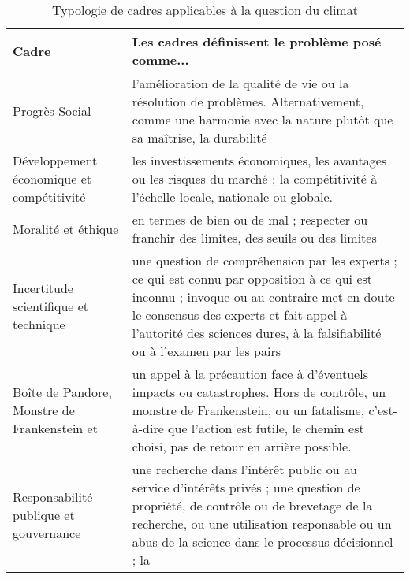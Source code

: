             \begin{table}[h]
                \caption{Typologie de cadres applicables à la question du climat}
                \label{table:typonisbet}
                \begin{tabularx}{\linewidth}{|K{0.30\textwidth}|X|}

                    \hline
                    \textbf{Cadre} & \textbf{Les cadres définissent le problème posé comme...} \\ \hline
                    \hline
                    Progrès Social
                    & l'amélioration de la qualité de vie ou la résolution de problèmes. Alternativement, comme une harmonie avec la nature plutôt que sa maîtrise, la durabilité
                    \\ \hline

                    Développement économique et compétitivité
                    & les investissements économiques, les avantages ou les risques du marché ; la compétitivité à l'échelle locale, nationale ou globale.
                    \\ \hline

                    Moralité et éthique
                    & en termes de bien ou de mal ; respecter ou franchir des limites, des seuils ou des limites
                    \\ \hline

                    Incertitude scientifique et technique
                    & une question de compréhension par les experts ; ce qui est connu par opposition à ce qui est inconnu ; invoque ou au contraire met en doute le consensus des experts et fait appel à l'autorité des sciences dures, à la falsifiabilité ou à l'examen par les pairs
                    \\ \hline

                    Boîte de Pandore, Monstre de Frankenstein et 
                    & un appel à la précaution face à d'éventuels impacts ou catastrophes. Hors de contrôle, un monstre de Frankenstein, ou un fatalisme, c'est-à-dire que l'action est futile, le chemin est choisi, pas de retour en arrière possible.
                    \\ \hline

                    Responsabilité publique et gouvernance
                    & une recherche dans l'intérêt public ou au service d'intérêts privés ; une question de propriété, de contrôle ou de brevetage de la recherche, ou une utilisation responsable ou un abus de la science dans le processus décisionnel ; la 
                    \\ \hline


\end{tabularx}
\end{table}
